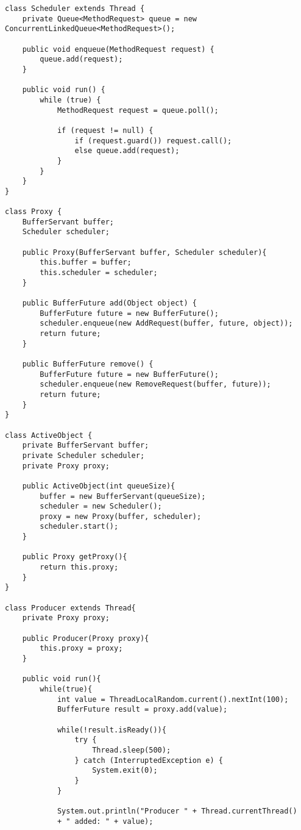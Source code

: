 \documentclass{article}
\begin{document}
\begin{verbatim}
class Scheduler extends Thread {
    private Queue<MethodRequest> queue = new ConcurrentLinkedQueue<MethodRequest>();

    public void enqueue(MethodRequest request) {
        queue.add(request);
    }

    public void run() {
        while (true) {
            MethodRequest request = queue.poll();

            if (request != null) {
                if (request.guard()) request.call();
                else queue.add(request);
            }
        }
    }
}

class Proxy {
    BufferServant buffer;
    Scheduler scheduler;

    public Proxy(BufferServant buffer, Scheduler scheduler){
        this.buffer = buffer;
        this.scheduler = scheduler;
    }

    public BufferFuture add(Object object) {
        BufferFuture future = new BufferFuture();
        scheduler.enqueue(new AddRequest(buffer, future, object));
        return future;
    }

    public BufferFuture remove() {
        BufferFuture future = new BufferFuture();
        scheduler.enqueue(new RemoveRequest(buffer, future));
        return future;
    }
}

class ActiveObject {
    private BufferServant buffer;
    private Scheduler scheduler;
    private Proxy proxy;

    public ActiveObject(int queueSize){
        buffer = new BufferServant(queueSize);
        scheduler = new Scheduler();
        proxy = new Proxy(buffer, scheduler);
        scheduler.start();
    }

    public Proxy getProxy(){
        return this.proxy;
    }
}

class Producer extends Thread{
    private Proxy proxy;

    public Producer(Proxy proxy){
        this.proxy = proxy;
    }

    public void run(){
        while(true){
            int value = ThreadLocalRandom.current().nextInt(100);
            BufferFuture result = proxy.add(value);

            while(!result.isReady()){
                try {
                    Thread.sleep(500);
                } catch (InterruptedException e) {
                    System.exit(0);
                }
            }

            System.out.println("Producer " + Thread.currentThread() 
            + " added: " + value);


\end{verbatim}
\end{document}
